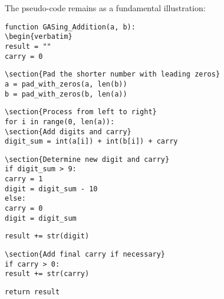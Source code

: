 The pseudo-code remains as a fundamental illustration:

\begin{verbatim}
function GASing_Addition(a, b):
\begin{verbatim}
result = ""
carry = 0
\end{verbatim}
    
\begin{verbatim}
\section{Pad the shorter number with leading zeros}
a = pad_with_zeros(a, len(b))
b = pad_with_zeros(b, len(a))
\end{verbatim}
    
\begin{verbatim}
\section{Process from left to right}
for i in range(0, len(a)):
\section{Add digits and carry}
digit_sum = int(a[i]) + int(b[i]) + carry
\end{verbatim}
        
\begin{verbatim}
\section{Determine new digit and carry}
if digit_sum > 9:
carry = 1
digit = digit_sum - 10
else:
carry = 0
digit = digit_sum
\end{verbatim}
            
\begin{verbatim}
result += str(digit)
\end{verbatim}
    
\begin{verbatim}
\section{Add final carry if necessary}
if carry > 0:
result += str(carry)
\end{verbatim}
        
\begin{verbatim}
return result
\end{verbatim}

